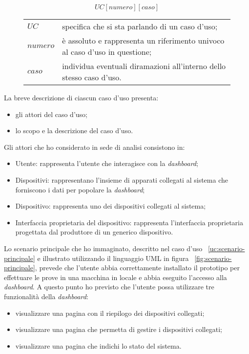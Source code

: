 \begin{figure}[H]
  \centering
  \[ UC[numero][caso] \]
  \begin{tabular}{@{}>{$}l<{$}l@{}}
    UC & specifica che si sta parlando di un caso d’uso;\\
    numero & è assoluto e rappresenta un riferimento univoco al caso d’uso in questione;\\
    caso & individua eventuali diramazioni all’interno dello stesso caso d’uso.\\
  \end{tabular}
\end{figure}

La breve descrizione di ciascun caso d’uso presenta:
\begin{itemize}
	\item gli attori del caso d’uso;
	\item lo scopo e la descrizione del caso d’uso.
\end{itemize}

Gli attori che ho considerato in sede di analisi consistono in:
\begin{itemize}
	\item Utente: rappresenta l'utente che interagisce con la \emph{dashboard};
	\item Dispositivi: rappresentano l'insieme di apparati collegati al sistema che forniscono i dati per popolare la \emph{dashboard};
	\item Dispositivo: rappresenta uno dei dispositivi collegati al sistema;
	\item Interfaccia proprietaria del dispositivo: rappresenta l'interfaccia proprietaria progettata dal produttore di un generico dispositivo.
\end{itemize}


Lo scenario principale che ho immaginato, descritto nel caso d'uso ~\ref{uc:scenario-principale} e illustrato utilizzando il linguaggio UML in figura ~\ref{fig:scenario-principale}, prevede che l'utente abbia correttamente installato il prototipo per effettuare le prove in una macchina in locale e abbia eseguito l'accesso alla \emph{dashboard}. A questo punto ho previsto che l'utente possa utilizzare tre funzionalità della \emph{dashboard}:
\begin{itemize}
  \item visualizzare una pagina con il riepilogo dei dispositivi collegati;
  \item visualizzare una pagina che permetta di gestire i dispositivi collegati;
  \item visualizzare una pagina che indichi lo stato del sistema.
\end{itemize}


